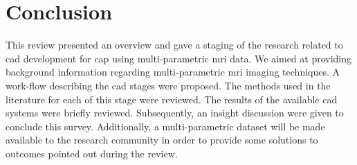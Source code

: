 \section{Conclusion} \label{sec:conclusion}

This review presented an overview and gave a staging of the research related to \ac{cad} development for \ac{cap} using multi-parametric \ac{mri} data. We aimed at providing background information regarding multi-parametric \ac{mri} imaging techniques. A work-flow describing the \ac{cad} stages were proposed. The methods used in the literature for each of this stage were reviewed. The results of the available \ac{cad} systems were briefly reviewed. Subsequently, an insight discussion were given to conclude this survey. Additionally, a multi-parametric dataset will be made available to the research community in order to provide some solutions to outcomes pointed out during the review.